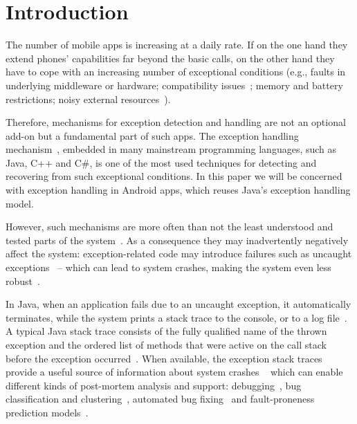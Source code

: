 \section{Introduction}
\label{intro}


The number of mobile apps is increasing at a daily rate. If on the one hand they
extend phones' capabilities far beyond the basic calls, on the other hand they have to 
cope with an increasing number of exceptional conditions 
(e.g., faults in underlying middleware or hardware; compatibility issues~\cite{McDon13}; 
memory and battery restrictions; noisy external resources~\cite{Zhang12}). 

Therefore, mechanisms for exception detection and handling are not an optional add-on but a 
fundamental part of such apps. The exception handling mechanism~\cite{goodenough1975exception},
embedded in many mainstream programming languages, such as Java, C++ and C\#,
 is one of the most used techniques for detecting and recovering from such exceptional conditions.
In this paper we will be concerned with exception handling in Android apps,
which reuses Java's exception handling model.
 


However, such mechanisms are more often than not the least 
understood and tested parts of the system~\cite{miller1997issues,Robil00,shah2010understanding, 
garcia2007extracting,garcia2001comparative,cabral2007exception,coelho2011unveiling,yuan:2014.osdi}.
As a consequence they may inadvertently negatively affect the system: exception-related code may introduce failures such as 
uncaught exceptions~\cite{jo2004uncaught, Zhang12} -- 
which can lead to system crashes, making the system even less robust~\cite{coelho2011unveiling}.

In Java, when an application fails due to an uncaught exception, 
it automatically terminates, while the system prints a stack trace to the console, 
or to a log file~\cite{gosling2000java}.  A typical Java stack trace consists of  the fully qualified name 
of the thrown exception and the ordered list of methods that were active on the call stack before 
the exception occurred~\cite{gosling2000java,bloch2008effective}.
When available, the exception stack traces provide a useful source of information about system crashes ~\cite{bettenburg2008makes} which 
can enable different kinds of post-mortem analysis and support:  debugging~\cite{schroter2010stack}, 
bug classification and clustering~\cite{wang2013improving, kim2011crash, dhaliwal2011classifying},  
automated bug fixing~\cite{sinha2009fault} and fault-proneness prediction models~\cite{kim2013predicting}. 

